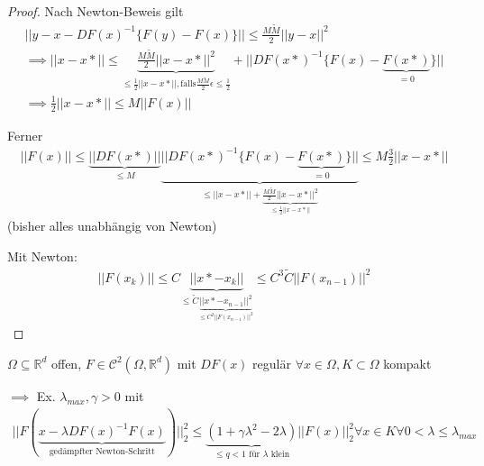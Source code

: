 \begin{proof}
	Nach Newton-Beweis gilt
	\begin{align*}
		||y - x - DF(x)^{-1} \{F(y) - F(x)\}|| \leq \frac{M\tilde{M}}{2} ||y-x||^2\\
		\implies ||x-x*|| \leq \underbrace{\frac{M \tilde{M}}{2} ||x-x*||^2}_{\leq \frac{1}{2} ||x-x*||, \text{falls} \frac{M \tilde{M}}{2} \epsilon \leq \frac{1}{2}} + ||DF(x*)^{-1} \{F(x) - \underbrace{F(x*)}_{=0}\}||\\
		\implies \frac{1}{2} ||x-x*|| \leq M ||F(x)||
	\end{align*}
	
	Ferner
	\begin{align*}
		||F(x)|| \leq \underbrace{||DF(x*)||}_{\leq M} \underbrace{||DF(x*)^{-1} \{F(x) - \underbrace{F(x*)}_{=0}\}||}_{\leq ||x-x*|| + \underbrace{\frac{M \tilde{M}}{2} ||x-x*||^2}_{\leq \frac{1}{2} ||x-x*||}} \leq
		M \frac{3}{2} ||x-x*||
	\end{align*}
	(bisher alles unabhängig von Newton)
	
	Mit Newton:
	\begin{align*}
		||F(x_k)|| \leq C \underbrace{||x*-x_k||}_{\leq \tilde{C} \underbrace{||x*-x_{n-1}||^2}_{\leq C^2 ||F(x_{n-1})||^2}} \leq C^3 \tilde{C} ||F(x_{n-1})||^2
	\end{align*}
\end{proof}

\begin{theorem}
	$\Omega \subseteq \mathbb{R}^d$ offen, $F \in \mathcal{C}^2(\Omega, \mathbb{R}^d)$ mit $DF(x)$ regulär $\forall x \in \Omega, K \subset \Omega$ kompakt
	
	$\implies$ Ex. $\lambda_{max}, \gamma > 0$ mit
	\begin{align*}
		||F(\underbrace{x - \lambda DF(x)^{-1}F(x)}_{\text{gedämpfter Newton-Schritt}})||_2^2 \leq
		\underbrace{(1 + \gamma \lambda^2 - 2\lambda)}_{\leq q < 1 \text{ für } \lambda \text{ klein}} ||F(x)||_2^2 \forall x \in K \forall 0 < \lambda \leq \lambda_{max}
	\end{align*}
\end{theorem}

